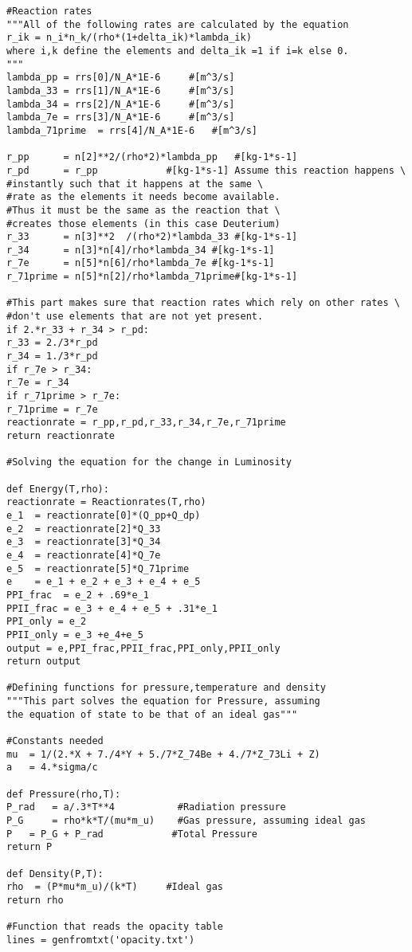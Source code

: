 \documentclass[a4paper,12pt]{article}
\begin{document}
\begin{verbatim}
#Reaction rates
"""All of the following rates are calculated by the equation
r_ik = n_i*n_k/(rho*(1+delta_ik)*lambda_ik)
where i,k define the elements and delta_ik =1 if i=k else 0.
"""
lambda_pp = rrs[0]/N_A*1E-6		#[m^3/s]
lambda_33 = rrs[1]/N_A*1E-6		#[m^3/s]
lambda_34 = rrs[2]/N_A*1E-6		#[m^3/s]
lambda_7e = rrs[3]/N_A*1E-6		#[m^3/s]
lambda_71prime  = rrs[4]/N_A*1E-6	#[m^3/s]

r_pp 	  = n[2]**2/(rho*2)*lambda_pp	#[kg-1*s-1]
r_pd  	  = r_pp			#[kg-1*s-1] Assume this reaction happens \
#instantly such that it happens at the same \
#rate as the elements it needs become available.
#Thus it must be the same as the reaction that \
#creates those elements (in this case Deuterium)
r_33 	  = n[3]**2  /(rho*2)*lambda_33	#[kg-1*s-1]
r_34 	  = n[3]*n[4]/rho*lambda_34	#[kg-1*s-1]
r_7e 	  = n[5]*n[6]/rho*lambda_7e	#[kg-1*s-1]
r_71prime = n[5]*n[2]/rho*lambda_71prime#[kg-1*s-1]

#This part makes sure that reaction rates which rely on other rates \
#don't use elements that are not yet present.
if 2.*r_33 + r_34 > r_pd:
r_33 = 2./3*r_pd
r_34 = 1./3*r_pd
if r_7e > r_34:
r_7e = r_34
if r_71prime > r_7e:
r_71prime = r_7e
reactionrate = r_pp,r_pd,r_33,r_34,r_7e,r_71prime
return reactionrate

#Solving the equation for the change in Luminosity

def Energy(T,rho):
reactionrate = Reactionrates(T,rho)
e_1  = reactionrate[0]*(Q_pp+Q_dp)
e_2  = reactionrate[2]*Q_33
e_3  = reactionrate[3]*Q_34
e_4  = reactionrate[4]*Q_7e
e_5  = reactionrate[5]*Q_71prime
e    = e_1 + e_2 + e_3 + e_4 + e_5
PPI_frac  = e_2 + .69*e_1
PPII_frac = e_3 + e_4 + e_5 + .31*e_1 
PPI_only = e_2
PPII_only = e_3 +e_4+e_5
output = e,PPI_frac,PPII_frac,PPI_only,PPII_only
return output

#Defining functions for pressure,temperature and density
"""This part solves the equation for Pressure, assuming 
the equation of state to be that of an ideal gas"""

#Constants needed
mu 	= 1/(2.*X + 7./4*Y + 5./7*Z_74Be + 4./7*Z_73Li + Z)
a 	= 4.*sigma/c

def Pressure(rho,T):
P_rad 	= a/.3*T**4           #Radiation pressure
P_G 	= rho*k*T/(mu*m_u)    #Gas pressure, assuming ideal gas
P	= P_G + P_rad            #Total Pressure
return P

def Density(P,T):
rho  = (P*mu*m_u)/(k*T)		#Ideal gas
return rho

#Function that reads the opacity table
lines = genfromtxt('opacity.txt')


\end{verbatim}
\end{document}
